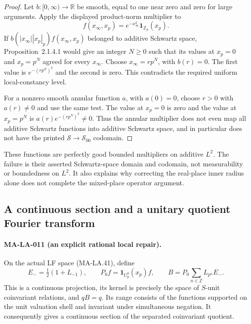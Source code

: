 \begin{proof}
Let $b:[0,\infty)\to\mathbb R$ be smooth, equal to one
near zero and zero for large arguments.  Apply the displayed
product-norm multiplier to
\[
       f(x_\infty,x_p)=e^{-x_\infty^2}\mathbf1_{\mathbb Z_p}(x_p).
 \tag{MA-LA.45}
\]
If $b(|x_\infty||x_p|_p)f(x_\infty,x_p)$ belonged to
additive Schwartz space, Proposition~2.1.4.1 would give an
integer $N\ge0$ such that its values at $x_p=0$ and
$x_p=p^N$ agreed for every $x_\infty$.
Choose $x_\infty=r p^N$, with $b(r)=0$.
The first value is $e^{-(r p^N)^2}$ and the second is zero.
This contradicts the required uniform local-constancy level.

For a nonzero smooth annular function $a$, with $a(0)=0$,
choose $r>0$ with $a(r)\ne0$ and use the same test.
The value at $x_p=0$ is zero and the value at $x_p=p^N$
is $a(r)e^{-(r p^N)^2}\ne0$.  Thus the annular multiplier
does not even map all additive Schwartz functions into
additive Schwartz space, and in particular does not have
the printed $\mathcal S\to\mathcal S_{00}$ codomain.
\end{proof}

These functions are perfectly good bounded multipliers on
additive $L^2$.  The failure is their asserted Schwartz-space
domain and codomain, not measurability or boundedness on $L^2$.
It also explains why correcting the real-place inner radius
alone does not complete the mixed-place operator argument.

\subsection{A continuous section and a unitary quotient Fourier transform}

\paragraph{MA-LA-011 (an explicit rational local repair).}
On the actual LF space (MA-LA.41), define
\[
 E_- =\tfrac12(1+L_{-1}),\qquad
 P_0 f=\mathbf1_{U_p^0}(x_p)f,\qquad
 B=P_0\sum_{n\in\mathbb Z}L_{p^n}E_- .
 \tag{MA-LA.46}
\]
This is a continuous projection, its kernel is precisely the
space of $S$-unit coinvariant relations, and $qB=q$.
Its range consists of the functions supported on the unit
valuation shell and invariant under simultaneous negation.
It consequently gives a continuous section of the separated
coinvariant quotient.

